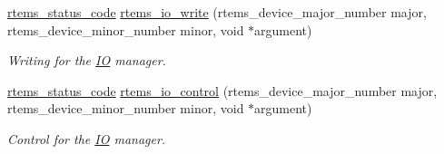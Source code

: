 \begin{DoxyCompactItemize}
\mbox{\hyperlink{group__ClassicStatus_ga545d41846817eaba6143d52ee4d9e9fe}{rtems\+\_\+status\+\_\+code}} \mbox{\hyperlink{group__ClassicIO_ga3afc6c6c994e739eabe3fdbdeb87dbd1}{rtems\+\_\+io\+\_\+write}} (rtems\+\_\+device\+\_\+major\+\_\+number major, rtems\+\_\+device\+\_\+minor\+\_\+number minor, void $\ast$argument)
\begin{DoxyCompactList}\small\item\em Writing for the \mbox{\hyperlink{structIO}{IO}} manager. \end{DoxyCompactList}\item 
\mbox{\hyperlink{group__ClassicStatus_ga545d41846817eaba6143d52ee4d9e9fe}{rtems\+\_\+status\+\_\+code}} \mbox{\hyperlink{group__ClassicIO_ga7eb8a5433040587b7b1deda8708b3022}{rtems\+\_\+io\+\_\+control}} (rtems\+\_\+device\+\_\+major\+\_\+number major, rtems\+\_\+device\+\_\+minor\+\_\+number minor, void $\ast$argument)
\begin{DoxyCompactList}\small\item\em Control for the \mbox{\hyperlink{structIO}{IO}} manager. \end{DoxyCompactList}\end{DoxyCompactItemize}
